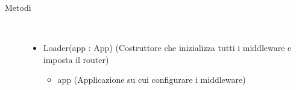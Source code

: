 \begin{description}
\item[Metodi] \hfill \\
 \vspace{-7mm}
\begin{itemize}
\item Loader(app : App) (Costruttore che inizializza tutti i middleware e imposta il router)\begin{itemize}
\item app (Applicazione su cui configurare i middleware)
\end{itemize}

\end{itemize}

\end{description}

\vspace{0.5cm}
\hypertarget{server::middleware::ErrorHandler}{}
